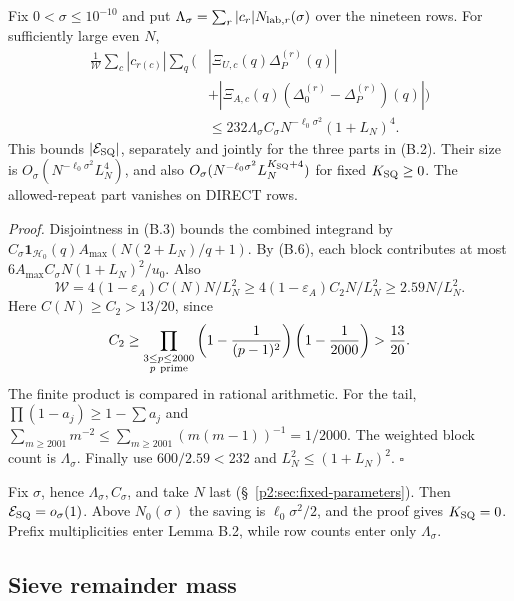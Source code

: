 \begin{theorem}\label{thm:repeated-primes}
Fix $0<\sigma\le10^{-10}$ and put
$\Lambda_\sigma=\sum_r|c_r|N_{{\rm lab},r}(\sigma)$ over the nineteen rows.
For sufficiently large even $N$,
\begingroup\small
\[
\begin{aligned}
 \frac1{\mathcal W}\sum_c|c_{r(c)}|\sum_q\Big(&|\Xi_{U,c}(q)\Delta_P^{(r)}(q)|\\
 &+|\Xi_{A,c}(q)(\Delta_0^{(r)}-\Delta_P^{(r)})(q)|\Big)\\
 &\le232\Lambda_\sigma C_\sigma N^{-\ell_0\sigma^2}(1+L_N)^4.
\end{aligned}
 \tag{B.7}
\]
\endgroup
This bounds $|\mathcal E_{\rm SQ}|$,
separately and jointly for the three parts in (B.2).
Their size is $O_\sigma(N^{-\ell_0\sigma^2}L_N^4)$,
and also $O_\sigma(N^{-\ell_0\sigma^2}L_N^{K_{\rm SQ}+4})$ for fixed $K_{\rm SQ}\ge0$.
The allowed-repeat part vanishes on DIRECT rows.
\end{theorem}

\emph{Proof.} Disjointness in (B.3) bounds the combined integrand by
$C_\sigma\mathbf1_{\mathcal H_0}(q)A_{\max}\allowbreak(N(2+L_N)/q+1)$.
By (B.6), each block contributes at most $6A_{\max}C_\sigma N(1+L_N)^2/u_0$.
Also
\[
 \mathcal W=4(1-\varepsilon_A)C(N)N/L_N^2
 \ge4(1-\varepsilon_A)C_2N/L_N^2\ge2.59N/L_N^2.
\]
Here $C(N)\ge C_2>13/20$, since
\[
 C_2\ge\prod_{\substack{3\le p\le2000\\p\ {\rm prime}}}
 \left(1-\frac1{(p-1)^2}\right)
 \left(1-\frac1{2000}\right)>\frac{13}{20}.
\]
The finite product is compared in rational arithmetic.
For the tail, $\prod(1-a_j)\ge1-\sum a_j$ and
$\sum_{m\ge2001}m^{-2}\le\sum_{m\ge2001}(m(m-1))^{-1}=1/2000$.
The weighted block count is $\Lambda_\sigma$.
Finally use $600/2.59<232$ and $L_N^2\le(1+L_N)^2$. $\square$

Fix $\sigma$, hence $\Lambda_\sigma,C_\sigma$, and take $N$ last
(\S~\ref{p2:sec:fixed-parameters}).
Then $\mathcal E_{\rm SQ}=o_\sigma(1)$.
Above $N_0(\sigma)$ the saving is $\ell_0\sigma^2/2$, and the proof gives $K_{\rm SQ}=0$.
Prefix multiplicities enter Lemma B.2, while row counts enter only $\Lambda_\sigma$.

\subsection{Sieve remainder mass}

